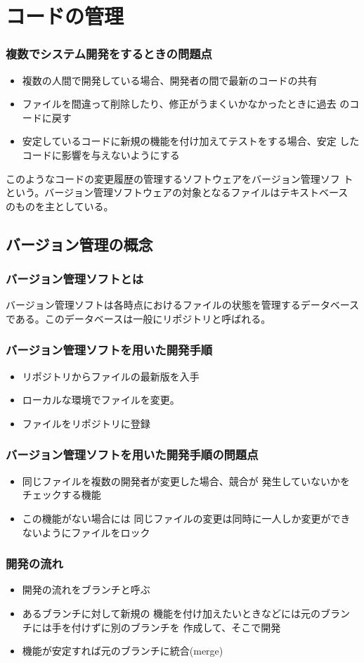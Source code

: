 \section{コードの管理}
 \begin{frame}[containsverbatim]
  \frametitle{複数でシステム開発をするときの問題点}
\begin{itemize}
 \item 複数の人間で開発している場合、開発者の間で最新のコードの共有
 \item ファイルを間違って削除したり、修正がうまくいかなかったときに過去
       のコードに戻す
 \item 安定しているコードに新規の機能を付け加えてテストをする場合、安定
       したコードに影響を与えないようにする
\end{itemize}
このようなコードの変更履歴の管理するソフトウェアをバージョン管理ソフ
トという。バージョン管理ソフトウェアの対象となるファイルはテキストベース
のものを主としている。
 \end{frame}
\subsection{バージョン管理の概念}
\begin{frame}[containsverbatim]
 \frametitle{バージョン管理ソフトとは}
バージョン管理ソフトは各時点におけるファイルの状態を管理するデータベース
 である。このデータベースは一般にリポジトリと呼ばれる。
\end{frame}
\begin{frame}[containsverbatim]
 \frametitle{バージョン管理ソフトを用いた開発手順}
\begin{itemize}
 \item リポジトリからファイルの最新版を入手
 \item ローカルな環境でファイルを変更。
 \item ファイルをリポジトリに登録
\end{itemize}
\end{frame}
\begin{frame}[containsverbatim]
 \frametitle{バージョン管理ソフトを用いた開発手順の問題点}
\begin{itemize}
 \item 同じファイルを複数の開発者が変更した場合、競合が
発生していないかをチェックする機能
 \item この機能がない場合には
同じファイルの変更は同時に一人しか変更ができないようにファイルをロック
\end{itemize}\end{frame}
\begin{frame}[containsverbatim]
 \frametitle{開発の流れ}
 \begin{itemize}
  \item 開発の流れをブランチと呼ぶ
  \item あるブランチに対して新規の
機能を付け加えたいときなどには元のブランチには手を付けずに別のブランチを
作成して、そこで開発
  \item 機能が安定すれば元のブランチに統合(merge)
 \end{itemize}
\end{frame}
